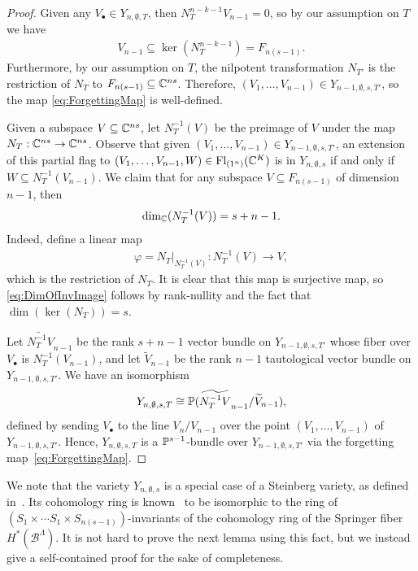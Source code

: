 \documentclass[12pt]{amsart}
\newcommand{\Fl}{\mathrm{Fl}}
\begin{document}
\begin{proof}
Given any $V_\bullet\in Y_{n,\emptyset,T}$, then $N_T^{n-k-1}V_{n-1} = 0$, so by our assumption on $T$ we have 
\begin{align}\label{eq:VContainedInFSpan}
V_{n-1} \subseteq \ker(N_T^{n-k-1})  = F_{n(s-1)}.
\end{align}
Furthermore, by our assumption on $T$, the nilpotent transformation $N_{T'}$ is the restriction of $N_T$ to $F_{n(s-1)}\subseteq \mathbb{C}^{ns}$.  Therefore, $(V_1,\dots, V_{n-1})\in Y_{n-1,\emptyset,s,T'}$, so the map \eqref{eq:ForgettingMap} is well-defined.

Given a subspace $V\subseteq \mathbb{C}^{ns}$, let $N_T^{-1}(V)$ be the preimage of $V$ under the map $N_T : \mathbb{C}^{ns}\to \mathbb{C}^{ns}$. Observe that given $(V_1,\dots, V_{n-1})\in Y_{n-1,\emptyset,s,T'}$, an extension of this partial flag to $(V_1,\dots, V_{n-1},W)\in \Fl_{(1^n)}(\bC^K)$ is in $Y_{n,\emptyset,s}$ if and only if $W\subseteq N_T^{-1}(V_{n-1})$. We claim that for any subspace $V\subseteq F_{n(s-1)}$ of dimension $n-1$, then 
\begin{align}\label{eq:DimOfInvImage}
\dim_{\mathbb{C}} (N_T^{-1}(V)) = s+n-1.
\end{align}
Indeed, define a linear map
\begin{align}
\varphi = N_T|_{N_T^{-1}(V)} : N_T^{-1}(V)\to V,
\end{align}
which is the restriction of $N_T$. It is clear that this map is surjective map, so \eqref{eq:DimOfInvImage} follows by rank-nullity and the fact that $\dim(\ker(N_T)) = s$.

Let $\widetilde{N_T^{-1}V}_{n-1}$ be the rank $s+n-1$ vector bundle on $Y_{n-1,\emptyset,s,T'}$ whose fiber over $V_\bullet$ is $N_T^{-1}(V_{n-1})$, and let $\widetilde V_{n-1}$ be the rank $n-1$ tautological vector bundle on $Y_{n-1,\emptyset,s,T'}$. We have an isomorphism
\begin{align}\label{eq:IsoOfProjBdl}
Y_{n,\emptyset,s,T} \cong \mathbb{P}(\widetilde{N_T^{-1}V}_{n-1}/\widetilde V_{n-1}),
\end{align}
defined by sending $V_\bullet$ to the line $V_n/V_{n-1}$ over the point $(V_1,\dots, V_{n-1})$ of $Y_{n-1,\emptyset,s,T'}$. Hence, $Y_{n,\emptyset,s,T}$ is a $\mathbb{P}^{s-1}$-bundle over $Y_{n-1,\emptyset,s,T'}$ via the forgetting map~\eqref{eq:ForgettingMap}.
\end{proof}



We note that the variety $Y_{n,\emptyset,s}$ is a special case of a Steinberg variety, as defined in~\cite{Borho-MacPherson,Precup-Tymoczko-Parabolic}. Its cohomology ring is known~\cite{Borho-MacPherson} to be isomorphic to the ring of $(S_1\times \cdots S_1 \times S_{n(s-1)})$-invariants of the cohomology ring of the Springer fiber $H^*(\mathcal{B}^{\Lambda})$. It is not hard to prove the next lemma using this fact, but we instead give a self-contained proof for the sake of completeness.
\end{document}
